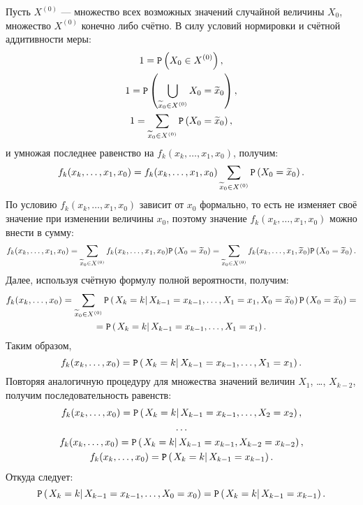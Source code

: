 \documentclass[12pt]{article}
\begin{document}
    Пусть $X^{(0)}$ --- множество всех возможных значений случайной величины $X_0$, множество $X^{(0)}$ конечно либо счётно. В силу условий нормировки и счётной аддитивности меры:
    \begin{gather*}
        1 = \mathtt{P} \left ( X_0 \in X^{(0)} \right ) , \\
        1 = \mathtt{P} \left ( \bigcup_{\widetilde{x}_0 \in X^{(0)}} X_0 = \widetilde{x}_0  \right ), \\
        1 = \sum_{\widetilde{x}_0 \in X^{(0)}} \mathtt{P} \left ( X_0 = \widetilde{x}_0  \right ) ,
    \end{gather*}
    и умножая последнее равенство на $f_k(x_k, \dots, x_1, x_0)$, получим:
    \[
        f_k(x_k, \dots, x_1, x_0) = f_k(x_k, \dots, x_1, x_0) \sum_{\widetilde{x}_0 \in X^{(0)}} \mathtt{P} \left ( X_0 = \widetilde{x}_0 \right ) .
    \]
    По условию $f_k(x_k, \dots, x_1, x_0)$ зависит от $x_0$ формально, то есть не изменяет своё значение при изменении величины $x_0$, поэтому значение
    $f_k(x_k, \dots, x_1, x_0)$ можно внести в сумму:
    \[
        f_k(x_k, \dots, x_1, x_0)
        = \sum_{\widetilde{x}_0 \in X^{(0)}} f_k(x_k, \dots, x_1, x_0) \mathtt{P} \left ( X_0 = \widetilde{x}_0 \right )
        = \sum_{\widetilde{x}_0 \in X^{(0)}} f_k(x_k, \dots, x_1, \widetilde{x}_0) \mathtt{P} \left ( X_0 = \widetilde{x}_0 \right ) .
    \]
    Далее, используя счётную формулу полной вероятности, получим:
    \begin{multline*}
        f_k(x_k, \dots, x_0)
        = \sum_{\widetilde{x}_0 \in X^{(0)}} \mathtt{P} \left ( \left . {X_k = k} \right | {X_{k-1} = x_{k-1}, \dots, X_1 = x_1, X_0 = \widetilde{x}_0} \right ) \mathtt{P} \left ( X_0 = \widetilde{x}_0 \right ) = \\
        = \mathtt{P} \left ( \left . {X_k = k} \right | {X_{k-1} = x_{k-1}, \dots, X_1 = x_1} \right ) .
    \end{multline*}
    Таким образом,
    \[
        f_k(x_k, \dots, x_0) = \mathtt{P} \left ( \left . {X_k = k} \right | {X_{k-1} = x_{k-1}, \dots, X_1 = x_1} \right ) .
    \]
    Повторяя аналогичную процедуру для множества значений величин $X_1$, \dots, $X_{k-2}$, получим последовательность равенств:
    \begin{gather*}
        f_k(x_k, \dots, x_0) = \mathtt{P} \left ( \left . {X_k = k} \right | {X_{k-1} = x_{k-1}, \dots, X_2 = x_2} \right ) , \\
        \dots \\
        f_k(x_k, \dots, x_0) = \mathtt{P} \left ( \left . {X_k = k} \right | {X_{k-1} = x_{k-1}, X_{k-2} = x_{k-2}} \right ) , \\
        f_k(x_k, \dots, x_0) = \mathtt{P} \left ( \left . {X_k = k} \right | {X_{k-1} = x_{k-1}} \right ) .
    \end{gather*}
    Откуда следует:
    \[
        \mathtt{P} \left ( \left . {X_k = k} \right | {X_{k-1} = x_{k-1}, \dots, X_0 = x_0} \right ) = \mathtt{P} \left ( \left . {X_k = k} \right | {X_{k-1} = x_{k-1}} \right ) .
    \]
\end{document}
